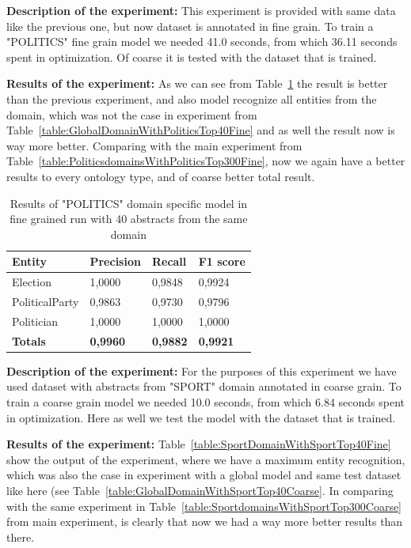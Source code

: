 \documentclass[thesis=M,english]{FITthesis}[2018/05/30]
\begin{document}
	\textbf{Description of the experiment:} This experiment is provided with same data like the previous one, but now dataset is annotated in fine grain. To train a "POLITICS" fine grain model we needed 41.0 seconds, from which 36.11 seconds spent in optimization. Of coarse it is tested with the dataset that is trained.

	\textbf{Results of the experiment:} As we can see from Table~\ref{table:PoliticsDomainWithPoliticsTop40Fine} the result is better than the previous experiment, and also model recognize all entities from the domain, which was not the case in experiment from Table~\ref{table:GlobalDomainWithPoliticsTop40Fine} and as well the result now is way more better. Comparing with the main experiment from Table~\ref{table:PoliticsdomainsWithPoliticsTop300Fine}, now we again have a better results to every ontology type, and of coarse better total result. 
		
	\begin{table}[H]\centering
		\begin{tabular}{|l|l|l|l|}
			\hline {\textbf{Entity}} & {\textbf{Precision}} & {\textbf{Recall}} & {\textbf{F1 score}}\\\hline
				Election & 1,0000 & 0,9848 & 0,9924\\
				PoliticalParty & 0,9863 & 0,9730 & 0,9796\\
				Politician & 1,0000 & 1,0000 & 1,0000\\\hline
				\textbf{Totals} & \textbf{0,9960} & \textbf{0,9882} & \textbf{0,9921}\\\hline
		\end{tabular}
		\caption{Results of "POLITICS" domain specific model in fine grained run with 40 abstracts from the same domain \label{table:PoliticsDomainWithPoliticsTop40Fine}}
	\end{table}
			

	\textbf{Description of the experiment:} For the purposes of this experiment we have used dataset with abstracts from "SPORT" domain annotated in coarse grain. To train a coarse grain model we needed 10.0 seconds, from which 6.84 seconds spent in optimization. Here as well we test the model with the dataset that is trained.

	\textbf{Results of the experiment:} Table~\ref{table:SportDomainWithSportTop40Fine} show the output of the experiment, where we have a maximum entity recognition, which was also the case in experiment with a global model and same test dataset like here (see Table~\ref{table:GlobalDomainWithSportTop40Coarse}. In comparing with the same experiment in Table~\ref{table:SportdomainsWithSportTop300Coarse} from main experiment, is clearly that now we had a way more better results than there.  
	
\end{document}
